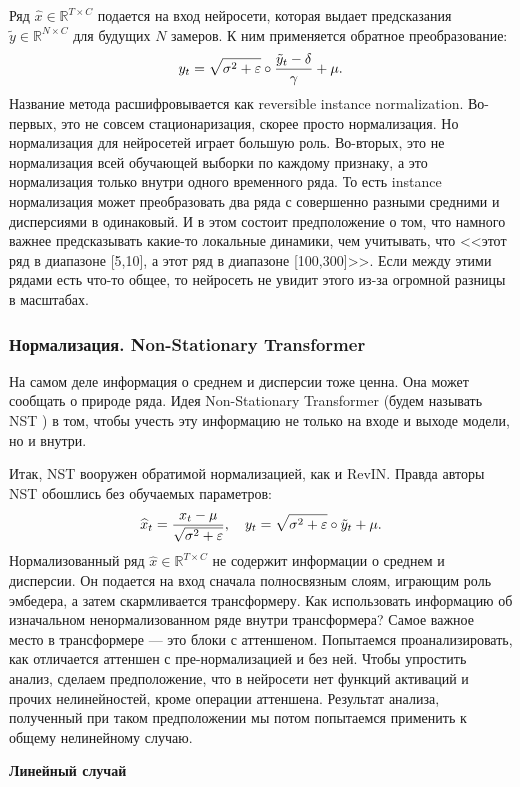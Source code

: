 \documentclass[12pt,fleqn]{article}
\newcommand{\R}{\mathbb{R}}
\begin{document}
Ряд $\widehat x\in\R^{T\times C}$ подается на вход нейросети, которая выдает предсказания $\widetilde y\in\R^{N\times C}$ для будущих $N$ замеров. К ним применяется обратное преобразование:
$$
y_t=\sqrt{\sigma^2+\varepsilon}\circ{\tilde y_t-\delta\over\gamma}+\mu.
$$
Название метода расшифровывается как reversible instance normalization. Во-первых, это не совсем стационаризация, скорее просто нормализация. Но нормализация для нейросетей играет большую роль. Во-вторых, это не нормализация всей обучающей выборки по каждому признаку, а это нормализация только внутри одного временного ряда. То есть instance нормализация может преобразовать два ряда с совершенно разными средними и дисперсиями в одинаковый. И в этом состоит предположение о том, что намного важнее предсказывать какие-то локальные динамики, чем учитывать, что <<этот ряд в диапазоне [5,10], а этот ряд в диапазоне [100,300]>>. Если между этими рядами есть что-то общее, то нейросеть не увидит этого из-за огромной разницы в масштабах.

\subsubsection{Нормализация. Non-Stationary Transformer}

На самом деле информация о среднем и дисперсии тоже ценна. Она может сообщать о природе ряда. Идея Non-Stationary Transformer (будем называть NST \cite{nst}) в том, чтобы учесть эту информацию не только на входе и выходе модели, но и внутри.

Итак, NST вооружен обратимой нормализацией, как и RevIN. Правда авторы NST обошлись без обучаемых параметров:
$$
\widehat x_t={x_t-\mu\over\sqrt{\sigma^2+\varepsilon}},\quad y_t=\sqrt{\sigma^2+\varepsilon}\circ \tilde y_t+\mu.
$$
Нормализованный ряд $\widehat x\in\R^{T\times C}$ не содержит информации о среднем и дисперсии. Он подается на вход сначала полносвязным слоям, играющим роль эмбедера, а затем скармливается трансформеру. Как использовать информацию об изначальном ненормализованном ряде внутри трансформера? Самое важное место в трансформере — это блоки с аттеншеном. Попытаемся проанализировать, как отличается аттеншен с пре-нормализацией и без ней. Чтобы упростить анализ, сделаем предположение, что в нейросети нет функций активаций и прочих нелинейностей, кроме операции аттеншена. Результат анализа, полученный при таком предположении мы потом попытаемся применить к общему нелинейному случаю.

\textbf{Линейный случай}
\end{document}
